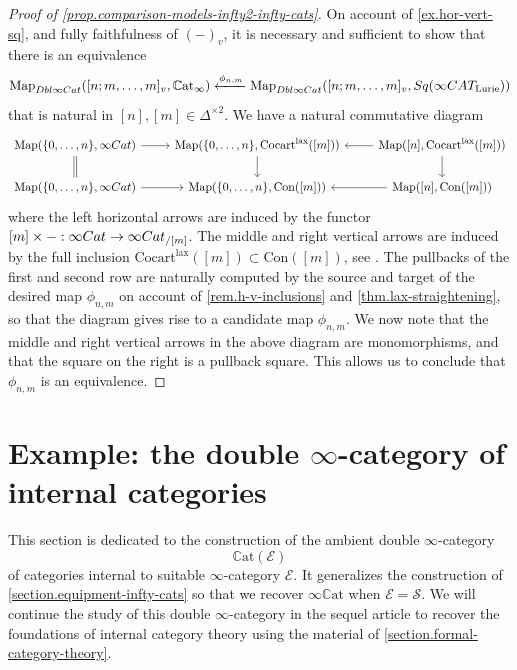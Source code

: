 \documentclass[a4paper, 11pt]{amsart}
\numberwithin{theorem}{section}
\theoremstyle{definition}
\newcommand{\cat}[1]{\textup{#1}}
\newcommand{\map}{\mathrm{Map}}
\newcommand{\Cat}{\cat{Cat}}
\newcommand{\CAT}{\cat{CAT}}
\newcommand{\Cocart}{\mathrm{Cocart}}
\newcommand{\lax}{\mathrm{lax}}
\renewcommand{\S}{\mathscr{S}}
\newcommand{\E}{\mathscr{E}}
\newcommand{\DbliCat}{\cat{Dbl}\infty\cat{Cat}}
\newcommand{\Sq}{\cat{Sq}}
\newcommand{\Con}{\mathrm{Con}}
\newcommand{\CCAT}{\mathbb{C}\mathrm{at}}
\begin{document}
\begin{proof}[Proof of \cref{prop.comparison-models-infty2-infty-cats}]
	On account of \cref{ex.hor-vert-sq}, and fully faithfulness of $(-)_v$,
	it is necessary and sufficient to show that there is an equivalence $$\map_{\DbliCat}([n;m, \dotsc, m]_v, \CCAT_\infty) \xleftarrow{\phi_{n,m}} \map_{\DbliCat}([n;m, \dotsc, m]_v, \Sq(\infty\CAT_\mathrm{Lurie}))$$
	that is natural in $[n], [m] \in \Delta^{\times 2}$.
	We have a natural commutative diagram 
	\[ 
		\begin{tikzcd}
			\map(\{0,\dotsc,n\}, \infty\Cat) \arrow[r]\arrow[d,equal] & \map(\{0,\dotsc,n\}, \Cocart^\lax([m]))\arrow[d] & \arrow[l] \map([n], \Cocart^\lax([m]))\arrow[d]\\
			\map(\{0,\dotsc,n\}, \infty\Cat) \arrow[r] & \map(\{0,\dotsc,n\}, \Con([m])) & \arrow[l] \map([n], \Con([m]))
		\end{tikzcd}
	\]
	where the left horizontal arrows are induced by the functor $[m] \times - : \infty\Cat \to \infty\Cat_{/[m]}$. The middle and right vertical arrows 
	are induced by the full inclusion $\Cocart^\lax([m]) \subset \Con([m])$, see \cite[Lemma 2.15]{AyalaFrancis}. The pullbacks of the first and second row are naturally computed 
	by the source and target of the desired map $\phi_{n,m}$ on account of \cref{rem.h-v-inclusions} and \cref{thm.lax-straightening}, so that the diagram gives rise to a candidate map $\phi_{n,m}$.
	We now note that the middle and right vertical arrows in the above diagram are monomorphisms, 
	and that the square on the right is a pullback square. This allows us to conclude that $\phi_{n,m}$ is an equivalence.
\end{proof}

\section{Example: the double \texorpdfstring{$\infty$}{∞}-category of internal categories}\label{section.equipment-internal-cats}

This section is dedicated to the construction of the ambient double $\infty$-category
$$
\CCAT(\E)
$$ 
of categories internal to suitable $\infty$-category $\E$. It generalizes the construction of \cref{section.equipment-infty-cats}
so that we recover $\infty\CCAT$ when $\E=\S$. We will continue the study 
of this double $\infty$-category in the sequel article \cite{EquipII} to recover the foundations of internal category theory using the material of \cref{section.formal-category-theory}.
\end{document}
